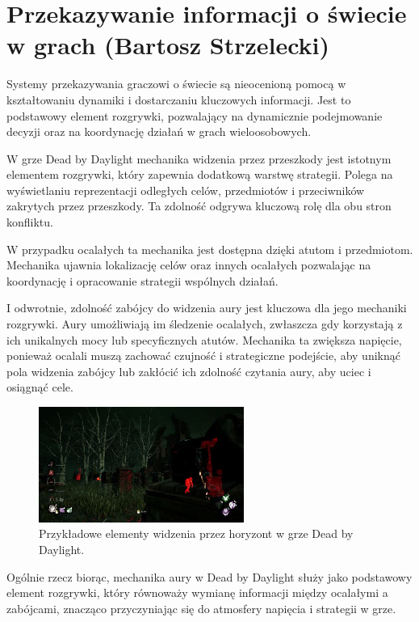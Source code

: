 \section{Przekazywanie informacji o świecie w grach (Bartosz Strzelecki)}\label{chap:dbd}
Systemy przekazywania graczowi o świecie są nieocenioną pomocą w kształtowaniu dynamiki i dostarczaniu kluczowych informacji.
Jest to podstawowy element rozgrywki, pozwalający na dynamicznie podejmowanie decyzji oraz na koordynację działań w grach wieloosobowych.

W grze Dead by Daylight mechanika widzenia przez przeszkody jest istotnym elementem rozgrywki, który
zapewnia dodatkową warstwę strategii. Polega na wyświetlaniu reprezentacji odległych celów, przedmiotów i przeciwników
zakrytych przez przeszkody. Ta zdolność odgrywa kluczową rolę dla obu stron konfliktu.

W przypadku ocalałych ta mechanika jest dostępna dzięki atutom i przedmiotom. Mechanika ujawnia lokalizację celów oraz
innych ocalałych pozwalając na koordynację i opracowanie strategii wspólnych działań.

I odwrotnie, zdolność zabójcy do widzenia aury jest kluczowa dla jego mechaniki rozgrywki.
Aury umożliwiają im śledzenie ocalałych, zwłaszcza gdy korzystają z ich unikalnych mocy lub specyficznych atutów. 
Mechanika ta zwiększa napięcie, ponieważ ocalali muszą zachować czujność i strategiczne podejście, 
aby uniknąć pola widzenia zabójcy lub zakłócić ich zdolność czytania aury, aby uciec i osiągnąć cele.

\begin{figure}[h]
\centering
\includegraphics[width=0.6\textwidth]{images/aura}
\caption{Przykładowe elementy widzenia przez horyzont w grze Dead by Daylight.}
\end{figure}

Ogólnie rzecz biorąc, mechanika aury w Dead by Daylight służy jako podstawowy element rozgrywki,
który równoważy wymianę informacji między ocalałymi a zabójcami, znacząco przyczyniając się do atmosfery napięcia i strategii w grze.

